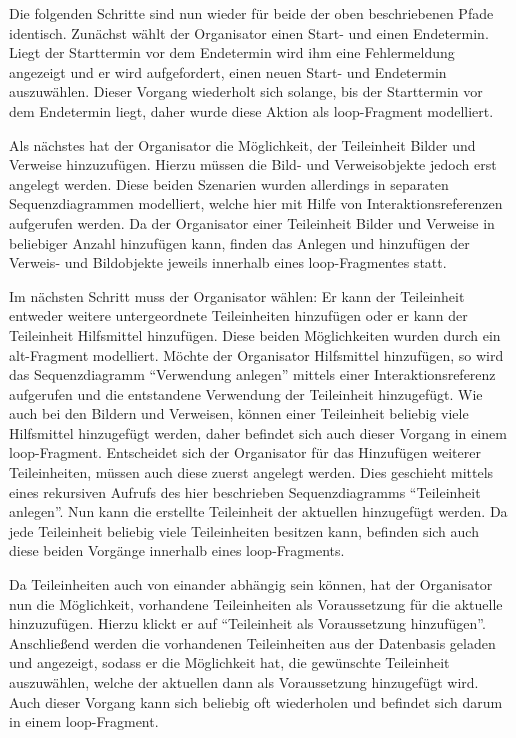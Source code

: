 Die folgenden Schritte sind nun wieder für beide der oben beschriebenen Pfade identisch. Zunächst wählt der Organisator einen Start- und einen Endetermin. Liegt der Starttermin vor dem Endetermin wird ihm eine Fehlermeldung angezeigt und er wird aufgefordert, einen neuen Start- und Endetermin auszuwählen. Dieser Vorgang wiederholt sich solange, bis der Starttermin vor dem Endetermin liegt, daher wurde diese Aktion als loop-Fragment modelliert.

Als nächstes hat der Organisator die Möglichkeit, der Teileinheit Bilder und Verweise hinzuzufügen. Hierzu müssen die Bild- und Verweisobjekte jedoch erst angelegt werden. Diese beiden Szenarien wurden allerdings in separaten Sequenzdiagrammen modelliert, welche hier mit Hilfe von Interaktionsreferenzen aufgerufen werden. Da der Organisator einer Teileinheit Bilder und Verweise in beliebiger Anzahl hinzufügen kann, finden das Anlegen und hinzufügen der Verweis- und Bildobjekte jeweils innerhalb eines loop-Fragmentes statt.

Im nächsten Schritt muss der Organisator wählen: Er kann der Teileinheit entweder weitere untergeordnete Teileinheiten hinzufügen oder er kann der Teileinheit Hilfsmittel hinzufügen. Diese beiden Möglichkeiten wurden durch ein alt-Fragment modelliert. Möchte der Organisator Hilfsmittel hinzufügen, so wird das Sequenzdiagramm \enquote{Verwendung anlegen} mittels einer Interaktionsreferenz aufgerufen und die entstandene Verwendung der Teileinheit hinzugefügt. Wie auch bei den Bildern und Verweisen, können einer Teileinheit beliebig viele Hilfsmittel hinzugefügt werden, daher befindet sich auch dieser Vorgang in einem loop-Fragment. Entscheidet sich der Organisator für das Hinzufügen weiterer Teileinheiten, müssen auch diese zuerst angelegt werden. Dies geschieht mittels eines rekursiven Aufrufs des hier beschrieben Sequenzdiagramms \enquote{Teileinheit anlegen}. Nun kann die erstellte Teileinheit der aktuellen hinzugefügt werden. Da jede Teileinheit beliebig viele Teileinheiten besitzen kann, befinden sich auch diese beiden Vorgänge innerhalb eines loop-Fragments.

Da Teileinheiten auch von einander abhängig sein können, hat der Organisator nun die Möglichkeit, vorhandene Teileinheiten als Voraussetzung für die aktuelle hinzuzufügen. Hierzu klickt er auf \enquote{Teileinheit als Voraussetzung hinzufügen}. Anschließend werden die vorhandenen Teileinheiten aus der Datenbasis geladen und angezeigt, sodass er die Möglichkeit hat, die gewünschte Teileinheit auszuwählen, welche der aktuellen dann als Voraussetzung hinzugefügt wird. Auch dieser Vorgang kann sich beliebig oft wiederholen und befindet sich darum in einem loop-Fragment.

